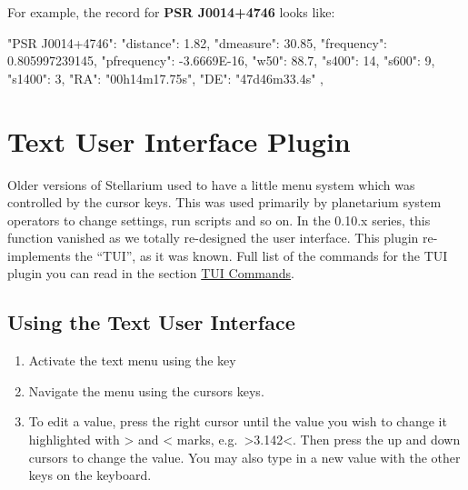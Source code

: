 \newpage
\noindent For example, the record for \textbf{PSR J0014+4746} looks like:
\begin{configfile}
"PSR J0014+4746":
{
    "distance": 1.82,
    "dmeasure": 30.85,
    "frequency": 0.805997239145,
    "pfrequency": -3.6669E-16,
    "w50": 88.7,
    "s400": 14,
    "s600": 9,
    "s1400": 3,
    "RA": "00h14m17.75s",
    "DE": "47d46m33.4s"
},
\end{configfile}

\section{Text User Interface Plugin}
\label{sec:plugins:TUI}


Older versions of Stellarium used to have a little menu system which was
controlled by the cursor keys. This was used primarily by planetarium
system operators to change settings, run scripts and so on. In the
0.10.x series, this function vanished as we totally re-designed the user
interface. This plugin re-implements the ``TUI'', as it was known. Full
list of the commands for the TUI plugin you can read in the section
\href{TUI_Commands}{TUI Commands}.

\subsection{Using the Text User Interface}
\label{sec:plugins:TUI:using}

\begin{enumerate}
\item
  Activate the text menu using the  key
\item
  Navigate the menu using the cursors keys.
\item
  To edit a value, press the right cursor until the value you wish to
  change it highlighted with \textgreater{} and \textless{} marks, e.g.\
  \textgreater{}3.142\textless{}. Then press the up and down cursors to
  change the value. You may also type in a new value with the other keys
  on the keyboard.
\end{enumerate}

